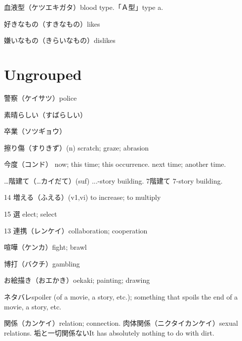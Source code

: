 血液型（ケツエキガタ）blood type.「Ａ型」type a.

好きなもの（すきなもの）likes

嫌いなもの（きらいなもの）dislikes

\section{Ungrouped}

警察（ケイサツ）police

素晴らしい（すばらしい）

卒業（ソツギョウ）

擦り傷（すりきず）(n) scratch; graze; abrasion

今度（コンド）
now; this time; this occurrence.
next time; another time.

…階建て（…カイだて）(suf) ...-story building.
7階建て 7-story building.

14 増える（ふえる）(v1,vi) to increase; to multiply

15 選 elect; select

13 連携（レンケイ）collaboration; cooperation

喧嘩（ケンカ）fight; brawl

博打（バクチ）gambling

お絵描き（おエかき）oekaki; painting; drawing

ネタバレspoiler (of a movie, a story, etc.); something that spoils the end of a movie, a story, etc.

関係（カンケイ）relation; connection.
肉体関係（ニクタイカンケイ）sexual relations.
垢と一切関係ないIt has absolutely nothing to do with dirt.
